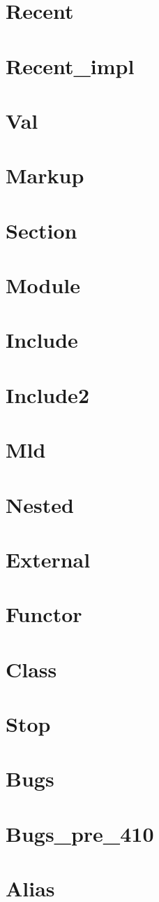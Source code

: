 \documentclass{book}
\newcommand{\inputchapter}[1]{\chapter{#1}
    }
\begin{document}
\inputchapter{Recent}
\inputchapter{Recent_impl}
\inputchapter{Val}
\inputchapter{Markup}
\inputchapter{Section}
\inputchapter{Module}
\inputchapter{Include}
\inputchapter{Include2}
\inputchapter{Mld}
\inputchapter{Nested}
\inputchapter{External}
\inputchapter{Functor}
\inputchapter{Class}
\inputchapter{Stop}
\inputchapter{Bugs}
\inputchapter{Bugs_pre_410}
\inputchapter{Alias}
\end{document}
